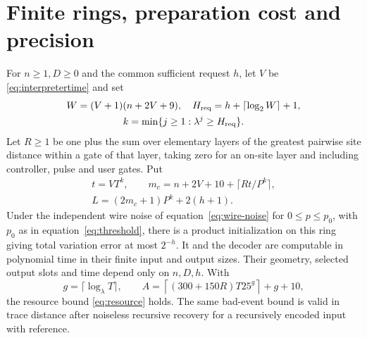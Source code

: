 \section{Finite rings, preparation cost and precision}\label{sec:finite}
\begin{lemma}\label{lem:finite}
For $n\ge1,D\ge0$ and the common sufficient request $h$, let $V$ be \eqref{eq:interpretertime} and set
\begin{equation}\label{eq:rankchoice}
\begin{gathered}
 W=(V+1)(n+2V+9),\quad H_{\rm req}=h+\lceil\log_2W\rceil+1,\\
 k=\min\{j\ge1:\lambda^j\ge H_{\rm req}\}.
\end{gathered}
\end{equation}
Let $R\ge1$ be one plus the sum over elementary layers of the greatest pairwise site distance within a gate of that layer, taking zero for an on-site layer and including controller, pulse and user gates. Put
\begin{equation}\label{eq:chart}
\begin{gathered}
 t=VT^k,\qquad
 m_c=n+2V+10+\lceil Rt/P^k\rceil,\\
 L=(2m_c+1)P^k+2(h+1).
\end{gathered}
\end{equation}
Under the independent wire noise of equation~\eqref{eq:wire-noise} for $0\le p\le p_0$, with $p_0$ as in equation~\eqref{eq:threshold}, there is a product initialization on this ring giving total variation error at most $2^{-h}$. It and the decoder are computable in polynomial time in their finite input and output sizes. Their geometry, selected output slots and time depend only on $n,D,h$. With
\begin{equation}\label{eq:A}
 g=\lceil\log_\lambda T\rceil,\qquad
 A=\left\lceil(300+150R)T25^g\right\rceil+g+10,
\end{equation}
the resource bound \eqref{eq:resource} holds. The same bad-event bound is valid in trace distance after noiseless recursive recovery for a recursively encoded input with reference.
\end{lemma}

